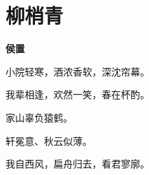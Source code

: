 \documentclass[12pt,a4paper]{ctexbook}
\begin{document}
\section{柳梢青}
\textbf{侯置}\par\vspace{0.5em}
小院轻寒，酒浓香软，深沈帘幕。\par
我辈相逢，欢然一笑，春在杯酌。\par
家山辜负猿鹤。\par
轩冕意、秋云似薄。\par
我自西风，扁舟归去，看君寥廓。\par
\end{document}
